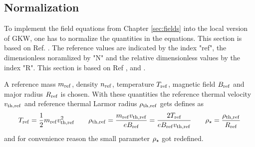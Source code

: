 \subsection{Normalization}
\label{sub:normalizationLocal}

To implement the field equations from Chapter \ref{sec:fields} into the local version of GKW, one has to normalize the quantities in the equations. This section is based on Ref. . The reference values are indicated by the index "ref", the dimensionless noramlized by "N" and the relative dimensionless values by the index "R". This section is based on Ref ,  and .
\bigskip

A reference mass $m_\mathrm{ref}$, density $n_\mathrm{ref}$, temperature $T_\mathrm{ref}$, magnetic field $B_\mathrm{ref}$ and major radius $R_\mathrm{ref}$ is chosen. With these quantities the reference thermal velocity $v_{\mathrm{th},\mathrm{ref}}$ and reference thermal Larmor radius $\rho_{\mathrm{th},\mathrm{ref}}$ gets defines as
\begin{gather}
    T_\mathrm{ref} = \frac{1}{2} m_\mathrm{ref} v_{\mathrm{th},\mathrm{ref}}^2 \qquad \rho_{\mathrm{th},\mathrm{ref}} = \frac{m_\mathrm{ref} v_{\mathrm{th},\mathrm{ref}}}{e B_\mathrm{ref}} = \frac{2 T_\mathrm{ref}}{e B_\mathrm{ref} v_{\mathrm{th},\mathrm{ref}}} \qquad  \rho_\star = \frac{\rho_{\mathrm{th},\mathrm{ref}}}{R_\mathrm{ref}}
\end{gather}
and for convenience reason the small parameter $\rho_\star$ got redefined.
\bigskip


